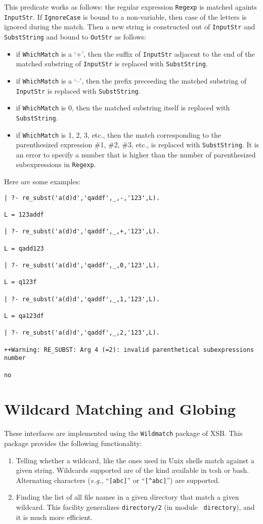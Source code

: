 This predicate works as follows: the regular expression {\tt Regexp} is
matched againts {\tt InputStr}. If {\tt IgnoreCase} is bound to a
non-variable, then case of the letters is ignored during the match.
Then a new string is constructed out of {\tt InputStr} and {\tt
SubstString} and bound to {\tt OutStr} as follows: 
\begin{itemize}
\item if {\tt WhichMatch} is a `+', then the suffix of {\tt InputStr}
  adjacent to the end of the matched substring of {\tt InputStr} is
  replaced with {\tt SubstString}.
\item if {\tt WhichMatch} is a `--', then the prefix preceeding the matched
  substring of {\tt InputStr} is replaced with {\tt SubstString}.
\item if {\tt WhichMatch} is 0, then the matched substring itself is
  replaced with {\tt SubstString}.
\item if {\tt WhichMatch} is 1, 2, 3, etc., then the match corresponding
  to the parenthesized expression \#1, \#2, \#3, etc., is replaced with
  {\tt SubstString}. It is an error to specify a number that is higher than
  the number of parenthesized subexpressions in {\tt Regexp}.
\end{itemize}
Here are some examples:
\begin{verbatim}
| ?- re_subst('a(d)d','qaddf',_,-,'123',L).

L = 123addf

| ?- re_subst('a(d)d','qaddf',_,+,'123',L).

L = qadd123

| ?- re_subst('a(d)d','qaddf',_,0,'123',L).

L = q123f

| ?- re_subst('a(d)d','qaddf',_,1,'123',L).

L = qa123df

| ?- re_subst('a(d)d','qaddf',_,2,'123',L).

++Warning: RE_SUBST: Arg 4 (=2): invalid parenthetical subexpressions number

no
\end{verbatim}

\section{Wildcard Matching and Globing}

These interfaces are implemented using the {\tt Wildmatch} package of XSB.
This package provides the following functionality: 
\begin{enumerate}
\item Telling whether a wildcard, like the ones used in Unix shells match
  against a given string. Wildcards supported are of the kind available in
  tcsh or bash. Alternating characters ({\it e.g.}, ``\verb|[abc]|'' or
  ``\verb|[^abc]|'') are supported.
\item Finding the list of all file names in a given directory that match a
  given wildcard. This facility generalizes {\tt directory/2} (in module {\tt
    directory}), and it is much more efficient.
\end{enumerate}

